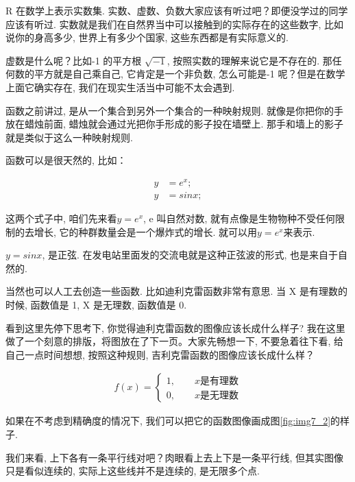 R 在数学上表示实数集. 实数、虚数、负数大家应该有听过吧？即便没学过的同学应该有听过. 实数就是我们在自然界当中可以接触到的实际存在的这些数字, 比如说你的身高多少, 世界上有多少个国家, 这些东西都是有实际意义的. 

虚数是什么呢？比如-1 的平方根 $\sqrt{-1}$, 按照实数的理解来说它是不存在的. 那任何数的平方就是自己乘自己, 它肯定是一个非负数, 怎么可能是-1 呢？但是在数学上面它确实存在, 我们在现实生活当中可能不太会遇到. 

函数之前讲过, 是从一个集合到另外一个集合的一种映射规则. 就像是你把你的手放在蜡烛前面, 蜡烛就会通过光把你手形成的影子投在墙壁上. 那手和墙上的影子就是类似于这么一种映射规则. 

函数可以是很天然的, 比如：

\begin{align*}
  y & = e^x; \\
  y & = sinx;
\end{align*}

这两个式子中, 咱们先来看$y=e^x$, e 叫自然对数, 就有点像是生物物种不受任何限制的去增长, 它的种群数量会是一个爆炸式的增长. 就可以用$y=e^x$来表示. 

$y=sinx$, 是正弦. 在发电站里面发的交流电就是这种正弦波的形式, 也是来自于自然的. 

当然也可以人工去创造一些函数. 比如迪利克雷函数非常有意思. 当 X 是有理数的时候, 函数值是 1, X 是无理数, 函数值是 0. 

看到这里先停下思考下, 你觉得迪利克雷函数的图像应该长成什么样子? 我在这里做了一个刻意的排版，将图放在了下一页。大家先畅想一下, 不要急着往下看, 给自己一点时间想想, 按照这种规则, 吉利克雷函数的图像应该长成什么样？

\begin{align*}
  f(x) = 
  \begin{cases}
    1, \qquad  x \mbox{是有理数} \\
    0, \qquad  x \mbox{是无理数}
  \end{cases}
\end{align*}

如果在不考虑到精确度的情况下, 我们可以把它的函数图像画成图\ref{fig:img7_2}的样子. 

我们来看, 上下各有一条平行线对吧？肉眼看上去上下是一条平行线, 但其实图像只是看似连续的, 实际上这些线并不是连续的, 是无限多个点. 

